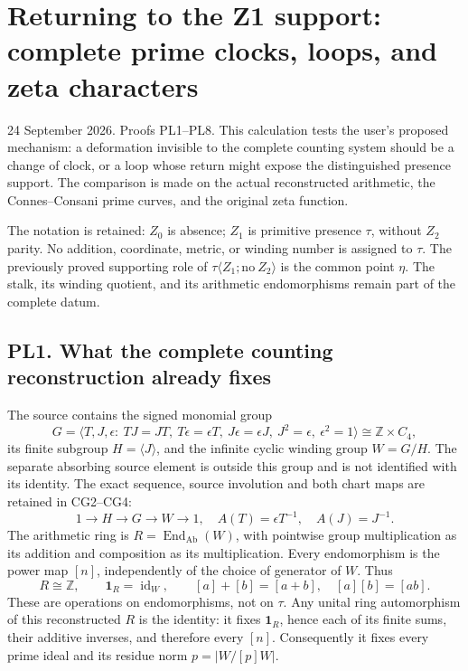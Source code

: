 \section{Returning to the Z1 support: complete prime clocks, loops, and
zeta
characters}\label{returning-to-the-z1-support-complete-prime-clocks-loops-and-zeta-characters}

24 September 2026. Proofs PL1--PL8. This calculation tests the user's
proposed mechanism: a deformation invisible to the complete counting
system should be a change of clock, or a loop whose return might expose
the distinguished presence support. The comparison is made on the actual
reconstructed arithmetic, the Connes--Consani prime curves, and the
original zeta function.

The notation is retained: \(Z_0\) is absence; \(Z_1\) is primitive
presence \(\tau\), without \(Z_2\) parity. No addition, coordinate,
metric, or winding number is assigned to \(\tau\). The previously proved
supporting role of \(\tau\langle Z_1;\mathrm{no}\ Z_2\rangle\) is the
common point \(\eta\). The stalk, its winding quotient, and its
arithmetic endomorphisms remain part of the complete datum.

\subsection{PL1. What the complete counting reconstruction already
fixes}\label{pl1.-what-the-complete-counting-reconstruction-already-fixes}

The source contains the signed monomial group \[
G=\langle T,J,\epsilon:\ TJ=JT,\ T\epsilon=\epsilon T,\
J\epsilon=\epsilon J,\ J^2=\epsilon,\ \epsilon^2=1\rangle
\cong\mathbb Z\times C_4,
\] its finite subgroup \(H=\langle J\rangle\), and the infinite cyclic
winding group \(W=G/H\). The separate absorbing source element is
outside this group and is not identified with its identity. The exact
sequence, source involution and both chart maps are retained in
CG2--CG4: \[
1\longrightarrow H\longrightarrow G\longrightarrow W\longrightarrow1,
\quad A(T)=\epsilon T^{-1},\quad A(J)=J^{-1}.
\tag{PL1.1}
\] The arithmetic ring is \(R=\operatorname{End}_{\mathrm{Ab}}(W)\),
with pointwise group multiplication as its addition and composition as
its multiplication. Every endomorphism is the power map \([n]\),
independently of the choice of generator of \(W\). Thus \[
R\cong\mathbb Z,\qquad \mathbf1_R=\operatorname{id}_W,\qquad
[a]+[b]=[a+b],\quad [a][b]=[ab].
\tag{PL1.2}
\] These are operations on endomorphisms, not on \(\tau\). Any unital
ring automorphism of this reconstructed \(R\) is the identity: it fixes
\(\mathbf1_R\), hence each of its finite sums, their additive inverses,
and therefore every \([n]\). Consequently it fixes every prime ideal and
its residue norm \(p=|W/[p]W|\).

